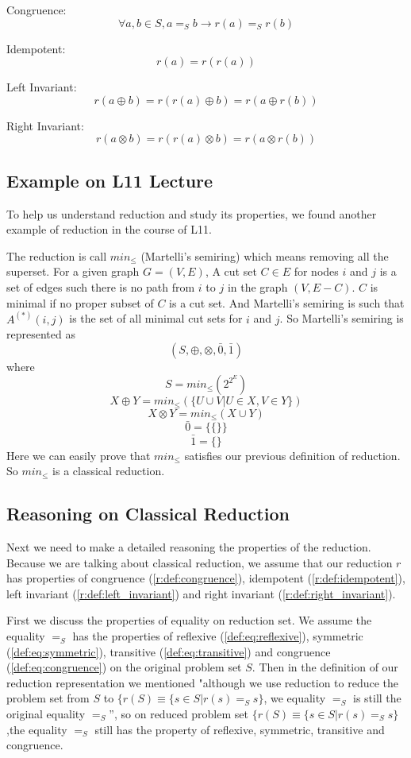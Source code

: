 \documentclass[a4paper,12pt,twoside,openright]{report}
\newcommand{\e}[2]{
\begin{equation}
  \label{#1} 
  #2
\end{equation}
}
\begin{document}
Congruence: \e{r:def:congruence}{\forall a,b \in S, a =_S b \rightarrow r(a) =_S r(b)}
Idempotent: \e{r:def:idempotent}{r(a) = r(r(a))} 
Left Invariant: \e{r:def:left_invariant}{r(a\oplus b) = r(r(a)\oplus b) = r(a\oplus r(b))}
Right Invariant: \e{r:def:right_invariant}{r(a\otimes b) = r(r(a)\otimes b) = r(a\otimes r(b))}

\subsection{Example on L11 Lecture}
To help us understand reduction and study its properties, we found another example of reduction in the course of L11.

The reduction is call $min_{\leq}$ (Martelli’s semiring)\cite{martelli_gaussian_1976} which means removing all the superset.
For a given graph $G = (V,E)$, A cut set $C \in E$ for nodes $i$ and $j$ is a set of edges such there is no path from $i$ to $j$ in the graph $(V, E - C)$. $C$ is minimal if no proper subset of $C$ is a cut set. And Martelli’s semiring is such that $A^{(*)}(i, j)$ is the set of all minimal cut sets for $i$ and $j$. 
So Martelli’s semiring is represented as \[(S,\oplus,\otimes,\bar0,\bar1)\] where \[S = min_\leq(2^{2^E})\] \[X\oplus Y = min_\leq(\{U \cup V | U \in X, V \in Y\})\] \[X\otimes Y = min_\leq(X \cup Y)\] \[\bar0 = \{\{\}\}\] \[\bar1 = \{\}\]
Here we can easily prove that $min_\leq$ satisfies our previous definition of reduction. So $min_\leq$ is a classical reduction.
\subsection{Reasoning on Classical Reduction}
Next we need to make a detailed reasoning the properties of the reduction.
Because we are talking about classical reduction, we assume that our reduction $r$ has properties of congruence (\ref{r:def:congruence}), idempotent (\ref{r:def:idempotent}), left invariant (\ref{r:def:left_invariant}) and right invariant (\ref{r:def:right_invariant}).

First we discuss the properties of equality on reduction set. We assume the equality $=_S$ has the properties of reflexive (\ref{def:eq:reflexive}), symmetric (\ref{def:eq:symmetric}), transitive (\ref{def:eq:transitive}) and congruence (\ref{def:eq:congruence}) on the original problem set $S$.
Then in the definition of our reduction representation we mentioned "although we use reduction to reduce the problem set from $S$ to $\{r(S) \equiv \{s \in S | r(s) =_S s\} $, we equality $=_S$ is still the original equality $=_S$”, so on reduced problem set $\{r(S) \equiv \{s \in S | r(s) =_S s\}$ ,the equality $=_S$ still has the property of reflexive, symmetric, transitive and congruence.
\end{document}
